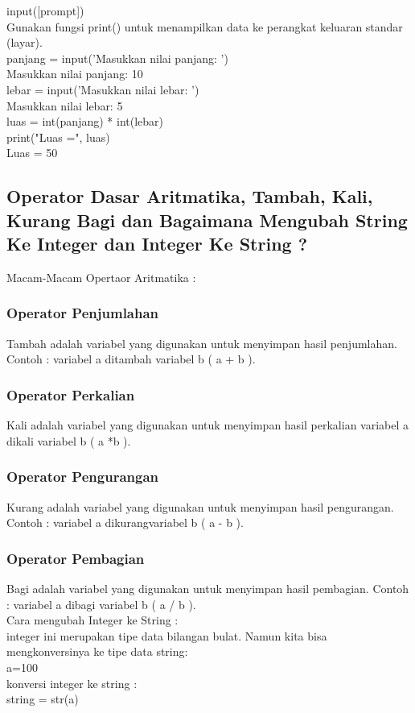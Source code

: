 input([prompt])\\

Gunakan fungsi print() untuk menampilkan data ke perangkat keluaran standar (layar).\\

 panjang = input('Masukkan nilai panjang: ')\\
Masukkan nilai panjang: 10\\
 lebar = input('Masukkan nilai lebar: ')\\
Masukkan nilai lebar: 5\\
 luas = int(panjang) * int(lebar)\\
 print("Luas =", luas)\\
Luas = 50\\
\subsection{Operator Dasar Aritmatika, Tambah, Kali, Kurang Bagi dan Bagaimana Mengubah String Ke Integer dan Integer Ke String ?}
Macam-Macam Opertaor Aritmatika :
\subsubsection{Operator Penjumlahan}
Tambah adalah variabel yang digunakan untuk menyimpan hasil penjumlahan. Contoh : variabel a ditambah variabel b ( a + b ).
\subsubsection{Operator Perkalian}
Kali adalah variabel yang digunakan untuk menyimpan hasil perkalian variabel a dikali variabel b ( a *b ).
\subsubsection{Operator Pengurangan}
Kurang adalah variabel yang digunakan untuk menyimpan hasil pengurangan. Contoh : variabel a dikurangvariabel b ( a - b ).
\subsubsection{Operator Pembagian}
Bagi adalah variabel yang digunakan untuk menyimpan hasil pembagian. Contoh : variabel a dibagi variabel b ( a / b ). \\

Cara mengubah Integer ke String :\\
integer ini merupakan tipe data bilangan bulat. Namun kita bisa mengkonversinya ke tipe data string:\\
a=100\\
konversi integer ke string : \\
string = str(a) \\

